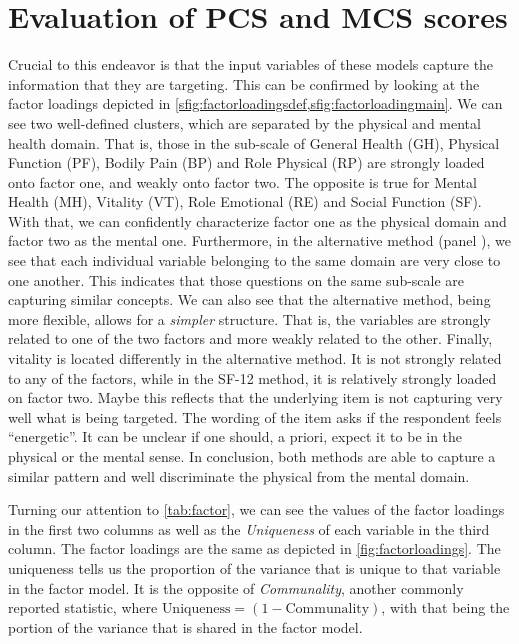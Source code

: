\section{Evaluation of PCS and MCS scores}


Crucial to this endeavor is that the input variables of these models capture the information that they are targeting.
This can be confirmed by looking at the factor loadings depicted in
\cref{sfig:factorloadingsdef,sfig:factorloadingmain}. We can see two well-defined clusters, which are
separated by the physical and mental health domain. That is, those in the sub-scale of General Health (GH),
Physical Function (PF), Bodily Pain (BP) and Role Physical (RP) are strongly loaded onto factor one, and weakly
onto factor two. The opposite is true for Mental Health (MH), Vitality (VT), Role Emotional (RE) and Social
Function (SF). With that, we can confidently characterize factor one as the physical domain and factor two as
the mental one. Furthermore, in the alternative method (panel ), we see that
each individual variable belonging to the same domain are very close to one another. This indicates that
those questions on the same sub-scale are capturing similar concepts. We can also see that the alternative
method, being more flexible, allows for a \textit{simpler} structure. That is, the variables are strongly
related to one of the two factors and more weakly related to the other. Finally, vitality is located
differently in the alternative method. It is not strongly related to any of the factors, while in the SF-12
method, it is relatively strongly loaded on factor two. Maybe this reflects that the underlying item is not
capturing very well what is being targeted. The wording of the item asks if the respondent feels ``energetic''.
It can be unclear if one should, a priori, expect it to be in the physical or the mental sense. In conclusion,
both methods are able to capture a similar pattern and well discriminate the physical from the mental domain.

Turning our attention to \cref{tab:factor}, we can see the values of the factor loadings in the first two
columns as well as the \textit{Uniqueness} of each variable in the third column. The factor loadings are the
same as depicted in \cref{fig:factorloadings}. The uniqueness tells us the proportion of the variance that is
unique to that variable in the factor model. It is the opposite of \textit{Communality}, another commonly
reported statistic, where $\text{Uniqueness} = (1-\text{Communality})$, with that being the portion of the
variance that is shared in the factor model.

